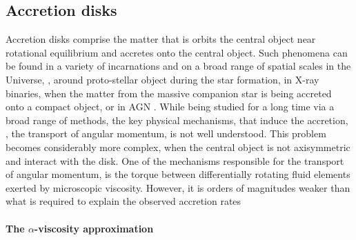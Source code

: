 \subsection{Accretion disks}

Accretion disks comprise the matter that is orbits the central object near rotational 
equilibrium and accretes onto the central object. Such phenomena can be found in a variety of 
incarnations and on a broad range of spatial scales in the Universe, \eg, around proto-stellar
object during the star formation, in X-ray binaries, when the matter from the massive 
companion star is being accreted onto a compact object, or in \ac{AGN}
\cite{see e.g. Pringle, 1981; Balbus & Hawley, 1998; Spruit, 2010a, for reviews}.
While being studied for a long time via a broad range of methods, the key physical mechanisms, 
that induce the accretion, \ie, the transport of angular momentum, is not well understood.
This problem becomes considerably more complex, when the central object is not axisymmetric 
and interact with the disk. 
One of the mechanisms responsible for the transport of angular momentum, is the torque between
differentially rotating fluid elements exerted by microscopic viscosity. However, it is 
orders of magnitudes weaker than what is required to explain the observed accretion rates 
\cite{e.g. Lust, 1952} 

\paragraph{The $\alpha$-viscosity approximation}

